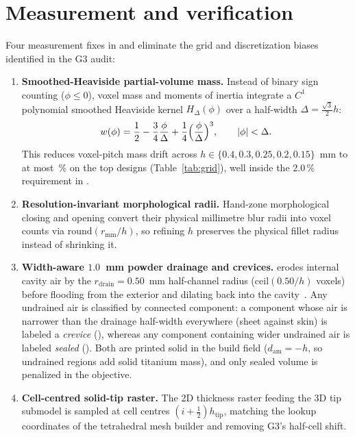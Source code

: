 \section{Measurement and verification}\label{sec:measure}
Four measurement fixes in  and 
eliminate the grid and discretization biases identified in the G3 audit:
\begin{enumerate}
\item \textbf{Smoothed-Heaviside partial-volume mass.} Instead of binary sign counting ($\phi \le 0$), voxel mass and moments
of inertia integrate a $C^1$ polynomial smoothed Heaviside kernel $H_\Delta(\phi)$ over a half-width $\Delta = \frac{\sqrt{3}}{2}h$:
\begin{equation}
w(\phi) = \frac{1}{2} - \frac{3}{4}\frac{\phi}{\Delta} + \frac{1}{4}\Bigl(\frac{\phi}{\Delta}\Bigr)^3, \qquad |\phi| < \Delta.
\end{equation}
This reduces voxel-pitch mass drift across $h \in \{0.4, 0.3, 0.25, 0.2, 0.15\}$~mm to at most \gGridAgree\,\% on the top
designs (Table~\ref{tab:grid}), well inside the $2.0\,\%$ requirement in .
\item \textbf{Resolution-invariant morphological radii.} Hand-zone morphological closing and opening convert their physical
millimetre blur radii into voxel counts via $\mathrm{round}(r_\mathrm{mm}/h)$, so refining $h$ preserves the physical fillet
radius instead of shrinking it.
\item \textbf{Width-aware $1.0$~mm powder drainage and crevices.}  erodes internal cavity
air by the $r_\mathrm{drain} = 0.50$~mm half-channel radius ($\mathrm{ceil}(0.50/h)$ voxels) before flooding from the exterior
and dilating back into the cavity~\cite{carrozza2023}. Any undrained air is classified by connected component: a component whose
air is narrower than the drainage half-width everywhere (sheet against skin) is labeled a \emph{crevice} (),
whereas any component containing wider undrained air is labeled \emph{sealed} (). Both are printed
solid in the build field ($d_\mathrm{am} = -h$, so undrained regions add solid titanium mass), and only sealed volume is
penalized in the objective.
\item \textbf{Cell-centred solid-tip raster.} The 2D thickness raster feeding the 3D  tip submodel is sampled at
cell centres $(i + \tfrac{1}{2})h_\mathrm{tip}$, matching the lookup coordinates of the tetrahedral mesh builder and removing
G3's half-cell shift.
\end{enumerate}

